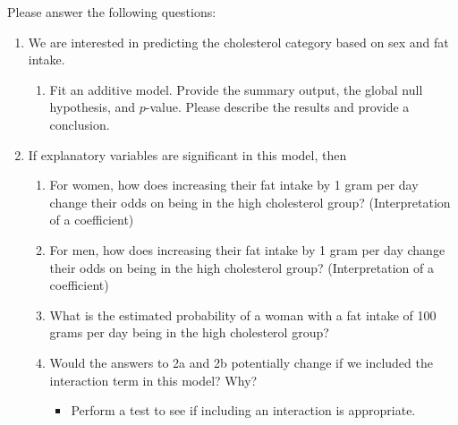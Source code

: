 \documentclass[12pt,letterpaper]{article}
\begin{document}
	\newpage
	\noindent Please answer the following questions:
	
	\begin{enumerate}
		\item
		We are interested in predicting the cholesterol category based on sex and fat intake.
		\begin{enumerate}
			\item
			Fit an additive model. Provide the summary output, the global null hypothesis, and $p$-value. Please describe the results and provide a conclusion.
		\end{enumerate}
		
		 
		
		\item
		If explanatory variables are significant in this model, then
		\begin{enumerate}
			\item
			For women, how does increasing their fat intake by 1 gram per day change their odds on being in the high cholesterol group? (Interpretation of a coefficient)
		
				
			\item
			For men, how does increasing their fat intake by 1 gram per day change their odds on being in the high cholesterol group? (Interpretation of a coefficient)
			
							
			
			\item
			What is the estimated probability of a woman with a fat intake of 100 grams per day being in the high cholesterol group? 
			
				
			
			\item
			Would the answers to 2a and 2b potentially change if we included the interaction term in this model? Why? 
			\begin{itemize}
				\item Perform a test to see if including an interaction is appropriate.
			\end{itemize}
			
				
			
		\end{enumerate}
	\end{enumerate}
	\newpage
	
\end{document}
